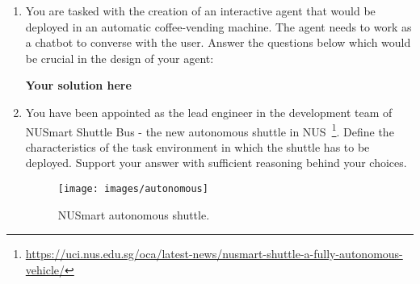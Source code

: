 \documentclass[12pt,letterpaper,pdftex]{report}
\theoremstyle{definition}
\begin{document}
\begin{enumerate}


\item You are tasked with the creation of an interactive agent that would be
deployed in an automatic coffee-vending machine. The agent needs to work as a
chatbot to converse with the user. Answer the questions below which would be
crucial in the design of your agent:


\begin{solution}
	\textbf{Your solution here}
\end{solution}


\item You have been appointed as the lead engineer in the development team of
NUSmart Shuttle Bus - the new autonomous shuttle in
NUS~\footnote{\url{https://uci.nus.edu.sg/oca/latest-news/nusmart-shuttle-a-fully-autonomous-vehicle/}}.
Define the characteristics of the task environment in which the shuttle has to
be deployed. Support your answer with sufficient reasoning behind your choices.
	

	
\begin{figure}[ht!]
	\centering
	\texttt{[image: images/autonomous]}
	\caption{NUSmart autonomous shuttle.}
	\label{autonomous}
\end{figure}


\end{enumerate}
\end{document}
